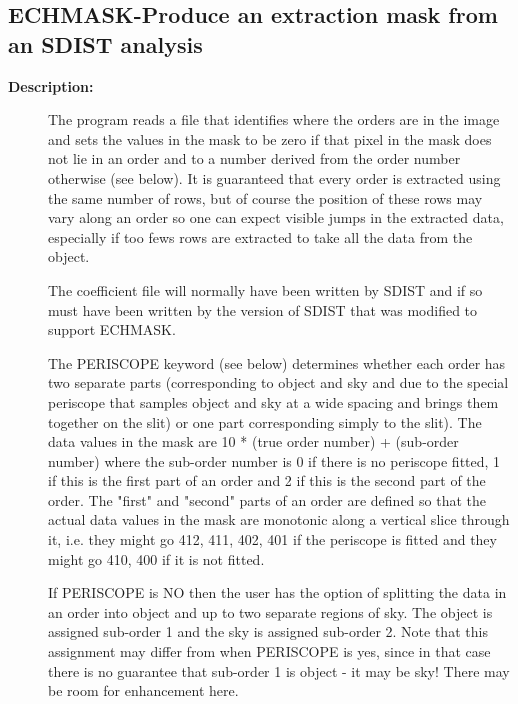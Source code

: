 \subsection{ECHMASK-\label{ECHMASK}Produce an extraction mask from an SDIST analysis}
\begin{description}

\item [{\bf Description:}]
 The program reads a file that identifies where the orders are in
 the image and sets the values in the mask to be zero if that pixel
 in the mask does not lie in an order and to a number derived from
 the order number otherwise (see below). It is guaranteed that
 every order is extracted using the same number of rows, but of
 course the position of these rows may vary along an order so one
 can expect visible jumps in the extracted data, especially if too
 fews rows are extracted to take all the data from the object.

 The coefficient file will normally have been written by SDIST and
 if so must have been written by the version of SDIST that was
 modified to support ECHMASK.

 The PERISCOPE keyword (see below) determines whether each order
 has two separate parts (corresponding to object and sky and due to
 the special periscope that samples object and sky at a wide
 spacing and brings them together on the slit) or one part
 corresponding simply to the slit).  The data values in the mask
 are 10 * (true order number) + (sub-order number) where the
 sub-order number is 0 if there is no periscope fitted, 1 if this
 is the first part of an order and 2 if this is the second part of
 the order. The "first" and "second" parts of an order are defined
 so that the actual data values in the mask are monotonic along a
 vertical slice through it, i.e. they might go 412, 411, 402, 401 if
 the periscope is fitted and they might go 410, 400 if it is not
 fitted.

 If PERISCOPE is NO then the user has the option of splitting
 the data in an order into object and up to two separate regions of
 sky. The object is assigned sub-order 1 and the sky is assigned
 sub-order 2. Note that this assignment may differ from when
 PERISCOPE is yes, since in that case there is no guarantee that
 sub-order 1 is object - it may be sky!  There may be room for
 enhancement here.



\end{description}

